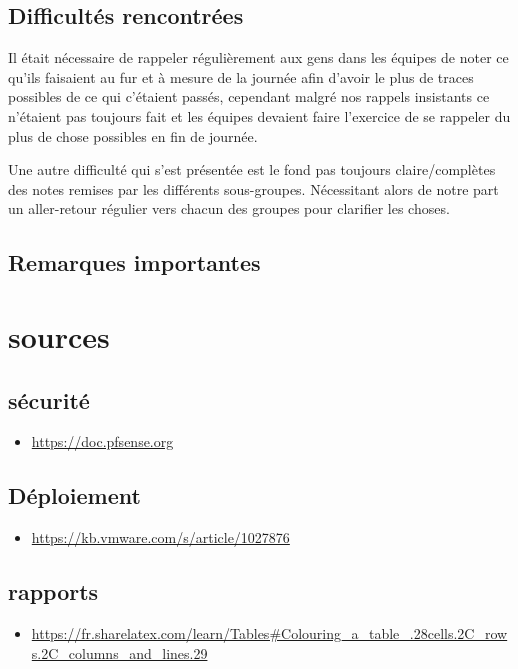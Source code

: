 \documentclass{article}
\begin{document}
    \subsection{Difficultés rencontrées} 
    Il était nécessaire de rappeler régulièrement aux gens dans les équipes de noter ce qu'ils faisaient au fur et à mesure de la journée afin d'avoir le plus de traces possibles de ce qui c'étaient passés, cependant malgré nos rappels insistants ce n'étaient pas toujours fait et les équipes devaient faire l'exercice de se rappeler du plus de chose possibles en fin de journée.
    
    Une autre difficulté qui s'est présentée est le fond pas toujours claire/complètes des notes remises par les différents sous-groupes. Nécessitant alors de notre part un aller-retour régulier vers chacun des groupes pour clarifier les choses.
    
    \subsection{Remarques importantes}

\section{sources}

    \subsection{sécurité}
        \begin{itemize}
            \item \url{https://doc.pfsense.org}
        \end{itemize}
        
    \subsection{Déploiement}
        \begin{itemize}
            \item \url{https://kb.vmware.com/s/article/1027876}
        \end{itemize}
        
    \subsection{rapports}
       \begin{itemize}
           \item \url{https://fr.sharelatex.com/learn/Tables#Colouring_a_table_.28cells.2C_rows.2C_columns_and_lines.29}
       \end{itemize}
\end{document}
